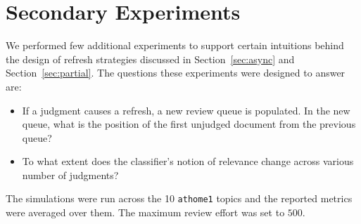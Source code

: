 \section{Secondary Experiments}
\label{sec:secondary}

We performed few additional experiments to support certain intuitions behind the
design of refresh strategies discussed in Section~\ref{sec:async} and
Section~\ref{sec:partial}. The questions these experiments were designed to
answer are:
\begin{itemize}
    \item If a judgment causes a refresh, a new review queue is populated.
        In the new queue, what is the position of the first unjudged document
        from the previous queue?
    \item To what extent does the classifier's notion of relevance change across
        various number of judgments?
\end{itemize}

The simulations were run across the 10
\texttt{athome1} topics and the reported metrics were averaged over them. The
maximum review effort was set to $500$.
